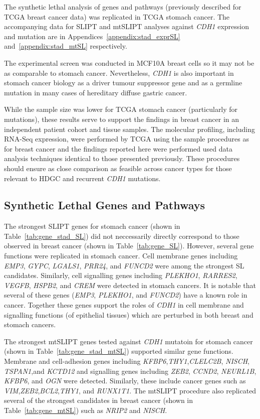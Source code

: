 The synthetic lethal analysis of genes and pathways (previously described for TCGA breast cancer data) was replicated in TCGA stomach cancer. The accompanying data for SLIPT and mtSLIPT analyses against \textit{CDH1} expression and mutation are in Appendices~\ref{appendix:stad_exprSL} and~\ref{appendix:stad_mtSL} respectively.

The experimental screen \citep{Telford2015} was conducted in MCF10A breast cells so it may not be as comparable to stomach cancer. Nevertheless, \textit{CDH1} is also important in stomach cancer biology as a driver tumour suppressor gene and as a germline mutation in many cases of hereditary diffuse gastric cancer.

While the sample size was lower for TCGA stomach cancer (particularly for mutations), these results serve to support the findings in breast cancer in an independent patient cohort and tissue samples. The molecular profiling, including RNA-Seq expression, were performed by TCGA using the sample procedures as for breast cancer and the findings reported here were performed used data analysis techniques identical to those presented previously. These procedures should ensure as close comparison as feasible across cancer types for those relevant to HDGC and recurrent \textit{CDH1} mutations.

\subsection{Synthetic Lethal Genes and Pathways} \label{chapt3:stad_SL_genes}

The strongest SLIPT genes for stomach cancer (shown in Table~\ref{tab:gene_stad_SL}) did not neccessarily directly correspond to those observed in breast cancer (shown in Table~\ref{tab:gene_SL}). However, several gene functions were replicated in stomach cancer. Cell membrane genes including \textit{EMP3}, \textit{GYPC},  \textit{LGALS1}, \textit{PRR24},  and \textit{FUNCD2} were among the strongest SL candidates. Similarly, cell signalling genes including \textit{PLEKHO1}, \textit{RARRES2}, \textit{VEGFB}, \textit{HSPB2}, and \textit{CREM} were detected in stomach cancers. It is notable that several of these genes (\textit{EMP3}, \textit{PLEKHO1}, and \textit{FUNCD2}) have a known role in cancer. Together these genes support the roles of \textit{CDH1} in cell membrane and signalling functions (of epithelial tissues) which are perturbed in both breast and stomach cancers.

The strongest mtSLIPT genes tested against \textit{CDH1} mutatoin for stomach cancer (shown in Table~\ref{tab:gene_stad_mtSL}) supported similar gene functions. Membrane and cell-adhesion genes including \textit{KFBP6},\textit{THY1},\textit{CLELC2B}, \textit{NISCH}, \textit{TSPAN1},and \textit{KCTD12} and signalling genes including \textit{ZEB2}, \textit{CCND2}, \textit{NEURL1B}, \textit{KFBP6}, and \textit{OGN} were detected. Similarly, these include cancer genes such as \textit{VIM},\textit{ZEB2},\textit{BCL2},\textit{THY1}, and \textit{RUNX1T1}. The mtSLIPT procedure also replicated several of the strongest candidates in breast cancer (shown in Table~\ref{tab:gene_mtSL}) such as \textit{NRIP2} and \textit{NISCH}.

